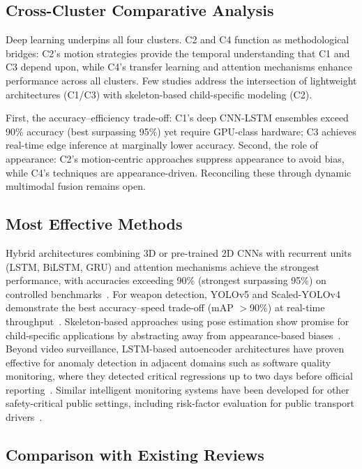 \documentclass[conference]{IEEEtran}
\begin{document}
\subsection{Cross-Cluster Comparative Analysis}

Deep learning underpins all four clusters. C2 and C4 function as methodological bridges: C2's motion strategies provide the temporal understanding that C1 and C3 depend upon, while C4's transfer learning and attention mechanisms enhance performance across all clusters. Few studies address the intersection of lightweight architectures (C1/C3) with skeleton-based child-specific modeling (C2).

First, the accuracy--efficiency trade-off: C1's deep CNN-LSTM ensembles exceed 90\% accuracy (best surpassing 95\%) yet require GPU-class hardware; C3 achieves real-time edge inference at marginally lower accuracy. Second, the role of appearance: C2's motion-centric approaches suppress appearance to avoid bias, while C4's techniques are appearance-driven. Reconciling these through dynamic multimodal fusion remains open.

\subsection{Most Effective Methods}

Hybrid architectures combining 3D or pre-trained 2D CNNs with recurrent units (LSTM, BiLSTM, GRU) and attention mechanisms achieve the strongest performance, with accuracies exceeding 90\% (strongest surpassing 95\%) on controlled benchmarks~\cite{b17,b18,b2}. For weapon detection, YOLOv5 and Scaled-YOLOv4 demonstrate the best accuracy--speed trade-off (mAP $>$90\%) at real-time throughput~\cite{b19,b9}. Skeleton-based approaches using pose estimation show promise for child-specific applications by abstracting away from appearance-based biases~\cite{b16,b20}. Beyond video surveillance, LSTM-based autoencoder architectures have proven effective for anomaly detection in adjacent domains such as software quality monitoring, where they detected critical regressions up to two days before official reporting~\cite{b24}. Similar intelligent monitoring systems have been developed for other safety-critical public settings, including risk-factor evaluation for public transport drivers~\cite{b29}.

\subsection{Comparison with Existing Reviews}
\end{document}
